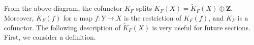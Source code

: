 From the above diagram, the cofunctor $K_F$ splits $K_F(X) = \tilde{K}_F(X) \oplus \mathbf{Z}$. Moreover, $\tilde{K}_F(f)$ for a map $f: Y \rightarrow X$ is the restriction of $K_F(f)$, and $\tilde{K}_F$ is a cofunctor. The following description of $\tilde{K}_F(X)$ is very useful for future sections. First, we consider a definition.
